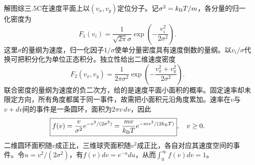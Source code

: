 \documentclass[UTF8,fontset=fandol,a4paper,11pt]{ctexart}
\begin{document}
解图综三.5C在速度平面上以$(v_x,v_y)$定位分子。记$\sigma^2=k_{\rm B}T/m$，各分量的归一化密度为
\[
F_1(v_i)=\frac1{\sqrt{2\pi}\sigma}
\exp\left(-\frac{v_i^2}{2\sigma^2}\right).
\]
这里$\sigma$的量纲为速度，归一化因子$1/\sigma$使单分量密度具有速度倒数的量纲。以$v_i/\sigma$代换可把积分化为单位正态积分。独立性给出二维速度密度
\[
F_2(v_x,v_y)=\frac1{2\pi\sigma^2}
\exp\left(-\frac{v_x^2+v_y^2}{2\sigma^2}\right).
\]
联合密度的量纲为速度的负二次方，给的是速度平面小面积的概率。固定速率却未限定方向，所有角度都属于同一事件，故需把小面积元沿角度累加。速率在$v$与$v+dv$间的事件是一条圆环，面积为$2\pi v\,dv$，因此
\[
\boxed{f(v)=\frac{v}{\sigma^2}e^{-v^2/(2\sigma^2)}
=\frac{mv}{k_{\rm B}T}e^{-mv^2/(2k_{\rm B}T)}},\quad v\ge0.
\]
二维圆环面积随$v$成正比，三维球壳面积随$v^2$成正比，各自对应其速度空间的事件。令$u=v^2/(2\sigma^2)$，有$f(v)dv=e^{-u}du$，从而$\int_0^\infty f(v)dv=1$。
\end{document}
